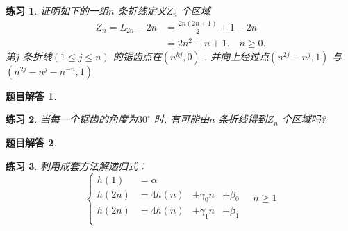 \documentclass[mode=geye]{elegantnote}
\newtheorem{exercise}{练习}
\newtheorem{answer}{题目解答}
\begin{document}
\begin{exercise}
	证明如下的一组$ n $ 条折线定义$ Z_n $ 个区域
	\begin{equation}
		\begin{aligned}
			Z_n = L_{2n}-2n &= \frac{2n(2n+1)}{2}+1-2n \\
			&=2n^2-n+1. \quad n\geqslant 0.
		\end{aligned}
	\end{equation}
	第$ j $ 条折线$ (1\leqslant j\leqslant n) $ 的锯齿点在$ (n^{kj},0) $ . 并向上经过点$ (n^{2j}-n^j,1) $ 与 $ (n^{2j}-n^j-n^{-n}, 1) $ 
\end{exercise}

\begin{answer}
	
\end{answer}

\begin{exercise}
	当每一个锯齿的角度为$ 30^{\circ} $ 时, 有可能由$ n $ 条折线得到$ Z_n $ 个区域吗?
\end{exercise}

\begin{answer}
	
\end{answer}

\begin{exercise}
	利用成套方法解递归式：
	\begin{equation*}
		\left\{
			\begin{array}{llll}
				h(1) &= \alpha &&\\
				h(2n) &= 4h(n) &+\gamma_0 n&+\beta_0\\
				h(2n) &= 4h(n) &+\gamma_1 n&+\beta_1\\
			\end{array}
		\right.\quad n\geqslant 1
	\end{equation*}
\end{exercise}
\end{document}

